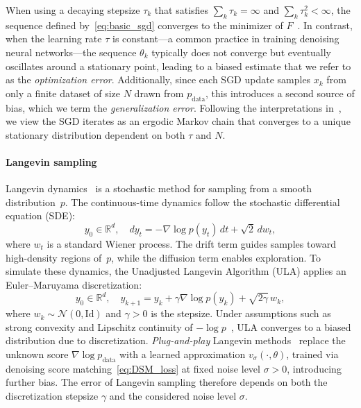\documentclass[11pt]{article}
\begin{document}
When using a decaying stepsize \(\tau_k\) that satisfies \(\sum_k \tau_k = \infty\) and \(\sum_k \tau_k^2 < \infty\), the sequence defined by~\eqref{eq:basic_sgd} converges to the minimizer of $F$~\cite{mandt2016variational}. In contrast, when the learning rate \(\tau\) is constant---a common practice in training denoising neural networks---the sequence \(\theta_k\) typically does not converge but eventually oscillates around a stationary point, leading to a biased estimate that we refer to as the \emph{optimization error}. Additionally, since each SGD update samples \(x_k\) from only a finite dataset of size \(N\) drawn from \(p_{\mathrm{data}}\), this introduces a second source of bias, which we term the \emph{generalization error}. Following the interpretations in~\cite{bach2013non, dieuleveut2020bridging}, we view the SGD iterates as an ergodic Markov chain that converges to a unique stationary distribution dependent on both \(\tau\) and \(N\).

\paragraph{Langevin sampling}  Langevin dynamics~\cite{langevin1908theorie} is a stochastic method for sampling from a smooth distribution~\( p \). The continuous-time dynamics follow the stochastic differential equation (SDE):
\begin{equation*} 
    y_0 \in \mathbb{R}^d, \quad d y_t = -\nabla \log p(y_t)\, dt + \sqrt{2}\, d w_t,
\end{equation*}
where \( w_t \) is a standard Wiener process. The drift term guides samples toward high-density regions of~\( p \), while the diffusion term enables exploration. To simulate these dynamics, the Unadjusted Langevin Algorithm (ULA) applies an Euler–Maruyama discretization:
\begin{equation} \label{eq:ULA}
    y_0 \in \mathbb{R}^d, \quad y_{k+1} = y_k + \gamma \nabla \log p(y_k) + \sqrt{2 \gamma}\, w_k,
\end{equation}
where \( w_k \sim \mathcal{N}(0, \mathrm{Id}) \) and \( \gamma > 0 \) is the stepsize. Under assumptions such as strong convexity and Lipschitz continuity of \( -\log p \)~\cite{eberle2016reflection, durmus2017nonasymptotic, dalalyan2017theoretical}, ULA converges to a biased distribution due to discretization. \emph{Plug-and-play} Langevin methods~\cite{song2019generative, laumont2022bayesian} replace the unknown score \( \nabla \log p_{\mathrm{data}} \) with a learned approximation \( v_\sigma(\cdot, \theta) \), trained via denoising score matching~\eqref{eq:DSM_loss} at fixed noise level \( \sigma > 0 \), introducing further bias. The error of Langevin sampling therefore depends on both the discretization stepsize $\gamma$ and the considered noise level $\sigma$.
\end{document}
